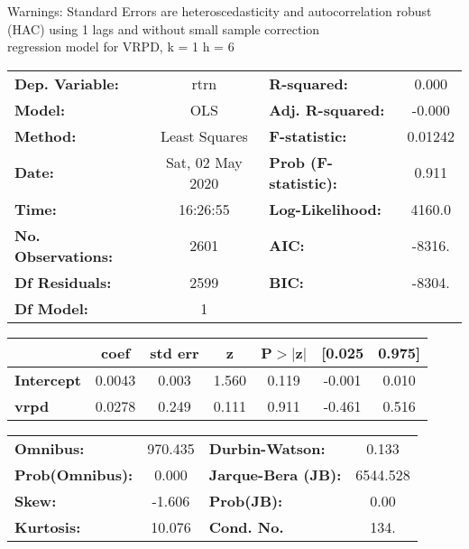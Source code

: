 Warnings: \newline
 [1] Standard Errors are heteroscedasticity and autocorrelation robust (HAC) using 1 lags and without small sample correction\\ 

regression model for VRPD, k = 1 h = 6\begin{center}
\begin{tabular}{lclc}
\toprule
\textbf{Dep. Variable:}    &       rtrn       & \textbf{  R-squared:         } &     0.000   \\
\textbf{Model:}            &       OLS        & \textbf{  Adj. R-squared:    } &    -0.000   \\
\textbf{Method:}           &  Least Squares   & \textbf{  F-statistic:       } &   0.01242   \\
\textbf{Date:}             & Sat, 02 May 2020 & \textbf{  Prob (F-statistic):} &    0.911    \\
\textbf{Time:}             &     16:26:55     & \textbf{  Log-Likelihood:    } &    4160.0   \\
\textbf{No. Observations:} &        2601      & \textbf{  AIC:               } &    -8316.   \\
\textbf{Df Residuals:}     &        2599      & \textbf{  BIC:               } &    -8304.   \\
\textbf{Df Model:}         &           1      & \textbf{                     } &             \\
\bottomrule
\end{tabular}
\begin{tabular}{lcccccc}
                   & \textbf{coef} & \textbf{std err} & \textbf{z} & \textbf{P$> |$z$|$} & \textbf{[0.025} & \textbf{0.975]}  \\
\midrule
\textbf{Intercept} &       0.0043  &        0.003     &     1.560  &         0.119        &       -0.001    &        0.010     \\
\textbf{vrpd}      &       0.0278  &        0.249     &     0.111  &         0.911        &       -0.461    &        0.516     \\
\bottomrule
\end{tabular}
\begin{tabular}{lclc}
\textbf{Omnibus:}       & 970.435 & \textbf{  Durbin-Watson:     } &    0.133  \\
\textbf{Prob(Omnibus):} &   0.000 & \textbf{  Jarque-Bera (JB):  } & 6544.528  \\
\textbf{Skew:}          &  -1.606 & \textbf{  Prob(JB):          } &     0.00  \\
\textbf{Kurtosis:}      &  10.076 & \textbf{  Cond. No.          } &     134.  \\
\bottomrule
\end{tabular}
\end{center}

